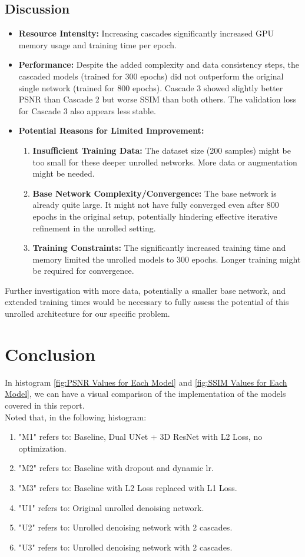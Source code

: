\documentclass{article}
\begin{document}
\subsection{Discussion}
\begin{itemize}
  \item \textbf{Resource Intensity:} Increasing cascades significantly increased GPU memory usage and training time per epoch.
  \item \textbf{Performance:} Despite the added complexity and data consistency steps, the cascaded models (trained for 300 epochs) did not outperform the original single network (trained for 800 epochs). Cascade 3 showed slightly better PSNR than Cascade 2 but worse SSIM than both others. The validation loss for Cascade 3 also appears less stable.
  \item \textbf{Potential Reasons for Limited Improvement:}
        \begin{enumerate}
          \item \textbf{Insufficient Training Data:} The dataset size (200 samples) might be too small for these deeper unrolled networks. More data or augmentation might be needed.
          \item \textbf{Base Network Complexity/Convergence:} The base network is already quite large. It might not have fully converged even after 800 epochs in the original setup, potentially hindering effective iterative refinement in the unrolled setting.
          \item \textbf{Training Constraints:} The significantly increased training time and memory limited the unrolled models to 300 epochs. Longer training might be required for convergence.
        \end{enumerate}
\end{itemize}
Further investigation with more data, potentially a smaller base network, and extended training times would be necessary to fully assess the potential of this unrolled architecture for our specific problem.



\section{Conclusion}
In histogram \ref{fig:PSNR Values for Each Model} and \ref{fig:SSIM Values for Each Model}, we can have a visual comparison of the implementation of the models covered in this report.\\
Noted that, in the following histogram:
\begin{enumerate}
  \item "M1" refers to: Baseline, Dual UNet + 3D ResNet with L2 Loss, no optimization.
  \item "M2" refers to: Baseline with dropout and dynamic lr.
  \item "M3" refers to: Baseline with L2 Loss replaced with L1 Loss.
  \item "U1" refers to: Original unrolled denoising network.
  \item "U2" refers to: Unrolled denoising network with 2 cascades.
  \item "U3" refers to: Unrolled denoising network with 2 cascades.
\end{enumerate}
\end{document}
